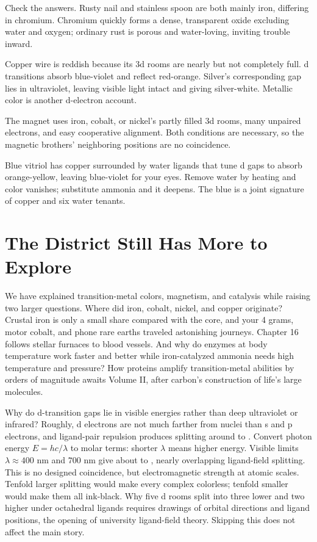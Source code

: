 Check the answers. Rusty nail and stainless spoon are both mainly iron, differing in chromium. Chromium quickly forms a dense, transparent oxide excluding water and oxygen; ordinary rust is porous and water-loving, inviting trouble inward.

Copper wire is reddish because its 3d rooms are nearly but not completely full. d transitions absorb blue-violet and reflect red-orange. Silver's corresponding gap lies in ultraviolet, leaving visible light intact and giving silver-white. Metallic color is another d-electron account.

The magnet uses iron, cobalt, or nickel's partly filled 3d rooms, many unpaired electrons, and easy cooperative alignment. Both conditions are necessary, so the magnetic brothers' neighboring positions are no coincidence.

Blue vitriol has copper surrounded by water ligands that tune d gaps to absorb orange-yellow, leaving blue-violet for your eyes. Remove water by heating and color vanishes; substitute ammonia and it deepens. The blue is a joint signature of copper and six water tenants.

\section{The District Still Has More to Explore}

We have explained transition-metal colors, magnetism, and catalysis while raising two larger questions. Where did iron, cobalt, nickel, and copper originate? Crustal iron is only a small share compared with the core, and your 4 grams, motor cobalt, and phone rare earths traveled astonishing journeys. Chapter 16 follows stellar furnaces to blood vessels. And why do enzymes at body temperature work faster and better while iron-catalyzed ammonia needs high temperature and pressure? How proteins amplify transition-metal abilities by orders of magnitude awaits Volume II, after carbon's construction of life's large molecules.

\begin{tiaozhan}
Why do d-transition gaps lie in visible energies rather than deep ultraviolet or infrared? Roughly, d electrons are not much farther from nuclei than s and p electrons, and ligand-pair repulsion produces splitting around  to . Convert photon energy $E = hc/\lambda$ to molar terms: shorter $\lambda$ means higher energy. Visible limits $\lambda \approx 400$ nm and $700$ nm give about  to , nearly overlapping ligand-field splitting. This is no designed coincidence, but electromagnetic strength at atomic scales. Tenfold larger splitting would make every complex colorless; tenfold smaller would make them all ink-black. Why five d rooms split into three lower and two higher under octahedral ligands requires drawings of orbital directions and ligand positions, the opening of university ligand-field theory. Skipping this does not affect the main story.
\end{tiaozhan}

